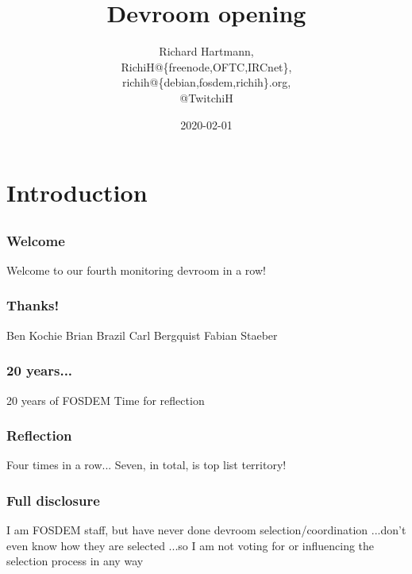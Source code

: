 \documentclass[aspectratio=169]{beamer}
\title{Devroom opening}
\subtitle{}
\author{Richard Hartmann,\\
RichiH@\{freenode,OFTC,IRCnet\},\\
richih@\{debian,fosdem,richih\}.org,\\
@TwitchiH}
\date{2020-02-01}
\begin{document}
\setcounter{tocdepth}{1}

\section{Introduction}

\subsection{}

\begin{frame}
	\titlepage
\end{frame}


\subsection{}

\begin{frame}
	\frametitle{Welcome}
	\begin{center}
		\vfill
		Welcome to our fourth monitoring devroom in a row!
		\vfill
	\end{center}
\end{frame}

\begin{frame}
	\frametitle{Thanks!}
	\begin{center}
		\vfill
		Ben Kochie
		\vfill
		Brian Brazil
		\vfill
		Carl Bergquist
		\vfill
		Fabian Staeber
		\vfill
	\end{center}
\end{frame}

\begin{frame}
	\frametitle{20 years...}
	\begin{center}
		\vfill
		20 years of FOSDEM
		\vfill
		Time for reflection
		\vfill
	\end{center}
\end{frame}

\begin{frame}
	\frametitle{Reflection}
	\begin{center}
		\vfill
		Four times in a row...
		\vfill
		Seven, in total, is top list territory!
		\vfill
	\end{center}
\end{frame}

\begin{frame}
	\frametitle{Full disclosure}
	\begin{center}
		\vfill
		I am FOSDEM staff, but have never done devroom selection/coordination
		\vfill
		...don't even know how they are selected
		\vfill
		...so I am not voting for or influencing the selection process in any way
		\vfill
	\end{center}
\end{frame}
\end{document}
